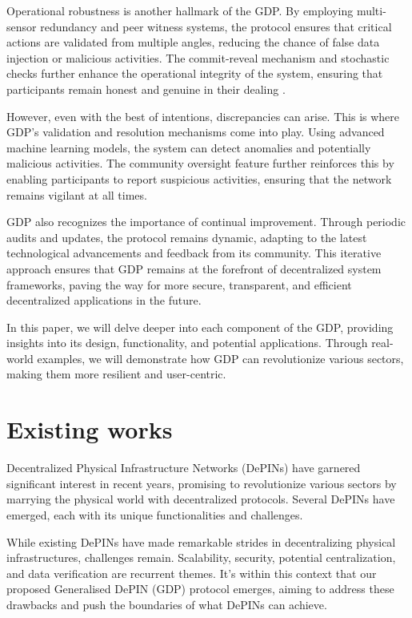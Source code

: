 \documentclass{article}
\begin{document}
Operational robustness is another hallmark of the GDP. By employing multi-sensor redundancy and peer witness systems, the protocol ensures that critical actions are validated from multiple angles, reducing the chance of false data injection or malicious activities. The commit-reveal mechanism and stochastic checks further enhance the operational integrity of the system, ensuring that participants remain honest and genuine in their dealing \cite{wood2014ethereum}.

However, even with the best of intentions, discrepancies can arise. This is where GDP's validation and resolution mechanisms come into play. Using advanced machine learning models, the system can detect anomalies and potentially malicious activities. The community oversight feature further reinforces this by enabling participants to report suspicious activities, ensuring that the network remains vigilant at all times\cite{zohar2015bitcoin}.

GDP also recognizes the importance of continual improvement. Through periodic audits and updates, the protocol remains dynamic, adapting to the latest technological advancements and feedback from its community. This iterative approach ensures that GDP remains at the forefront of decentralized system frameworks, paving the way for more secure, transparent, and efficient decentralized applications in the future.

In this paper, we will delve deeper into each component of the GDP, providing insights into its design, functionality, and potential applications. Through real-world examples, we will demonstrate how GDP can revolutionize various sectors, making them more resilient and user-centric.

\section{Existing works}

Decentralized Physical Infrastructure Networks (DePINs) have garnered significant interest in recent years, promising to revolutionize various sectors by marrying the physical world with decentralized protocols. Several DePINs have emerged, each with its unique functionalities and challenges. 

While existing DePINs have made remarkable strides in decentralizing physical infrastructures, challenges remain. Scalability, security, potential centralization, and data verification are recurrent themes. It's within this context that our proposed Generalised DePIN (GDP) protocol emerges, aiming to address these drawbacks and push the boundaries of what DePINs can achieve.
\end{document}
